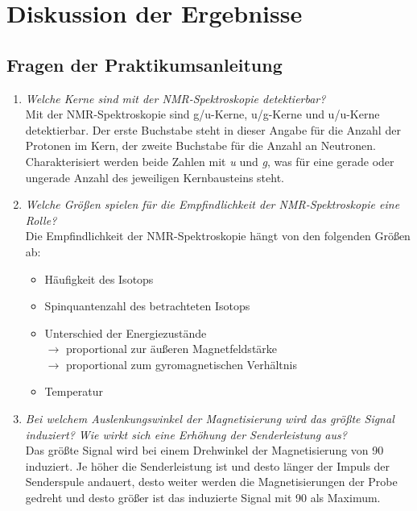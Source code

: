 \section{Diskussion der Ergebnisse}
\label{sec:diskussion}

\subsection{Fragen der Praktikumsanleitung}
\begin{enumerate}
	\item \textit{Welche Kerne sind mit der NMR-Spektroskopie detektierbar?}\vspace*{1mm}\\
	Mit der NMR-Spektroskopie sind g/u-Kerne, u/g-Kerne und u/u-Kerne detektierbar. Der erste Buchstabe steht in dieser Angabe für die Anzahl der Protonen im Kern, der zweite Buchstabe für die Anzahl an Neutronen. Charakterisiert werden beide Zahlen mit \textit{u} und \textit{g}, was für eine gerade oder ungerade Anzahl des jeweiligen Kernbausteins steht. 
	\item \textit{Welche Größen spielen für die Empfindlichkeit der NMR-Spektroskopie eine Rolle?}\vspace*{1mm}\\
	Die Empfindlichkeit der NMR-Spektroskopie hängt von den folgenden Größen ab:
	\begin{itemize}
		\item Häufigkeit des Isotops
		\item Spinquantenzahl des betrachteten Isotops
		\item Unterschied der Energiezustände\\
		$\rightarrow$ proportional zur äußeren Magnetfeldstärke\\
		$\rightarrow$ proportional zum gyromagnetischen Verhältnis
		\item Temperatur
	\end{itemize}
	
	\item \textit{Bei welchem Auslenkungswinkel der Magnetisierung wird das größte Signal induziert? Wie wirkt sich eine Erhöhung der Senderleistung aus?}\vspace{1mm}\\
	Das größte Signal wird bei einem Drehwinkel der Magnetisierung von \SI{90}{\degrees} induziert. Je höher die Senderleistung ist und desto länger der Impuls der Senderspule andauert, desto weiter werden die Magnetisierungen der Probe gedreht und desto größer ist das induzierte Signal mit \SI{90}{\degrees} als Maximum.
	

\end{enumerate}
